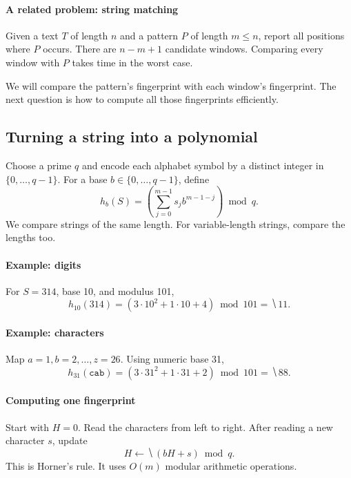 \documentclass[11pt]{article}
\begin{document}
\paragraph{A related problem: string matching}
Given a text $T$ of length $n$ and a pattern $P$ of length $m\leq n$, report
all positions where $P$ occurs. There are $n-m+1$ candidate windows.
Comparing every window with $P$ takes  time in the
worst case.

\vfill
We will compare the pattern's fingerprint with each window's fingerprint.
The next question is how to compute all those fingerprints efficiently.

\newpage
\subsection*{Turning a string into a polynomial}
Choose a prime $q$ and encode each alphabet symbol by a distinct integer in
$\{0,\ldots,q-1\}$. For a base $b\in\{0,\ldots,q-1\}$, define
\begin{equation*}
    h_b(S)=\left(\sum_{j=0}^{m-1}s_jb^{m-1-j}\right)\bmod q.
\end{equation*}
We compare strings of the same length. For variable-length strings, compare
the lengths too.

\paragraph{Example: digits}
For $S=314$, base 10, and modulus 101,
\begin{equation*}
    h_{10}(314)=(3\cdot10^2+1\cdot10+4)\bmod101=\hide{11}.
\end{equation*}

\paragraph{Example: characters}
Map $a=1,b=2,\ldots,z=26$. Using numeric base 31,
\begin{equation*}
    h_{31}(\texttt{cab})
      =(3\cdot31^2+1\cdot31+2)\bmod101
      =\hide{88}.
\end{equation*}

\paragraph{Computing one fingerprint}
Start with $H=0$. Read the characters from left to right. After reading a
new character $s$, update
\begin{equation*}
    H\gets\hide{(bH+s)\bmod q}.
\end{equation*}
This is Horner's rule. It uses $O(m)$ modular arithmetic operations.
\end{document}

